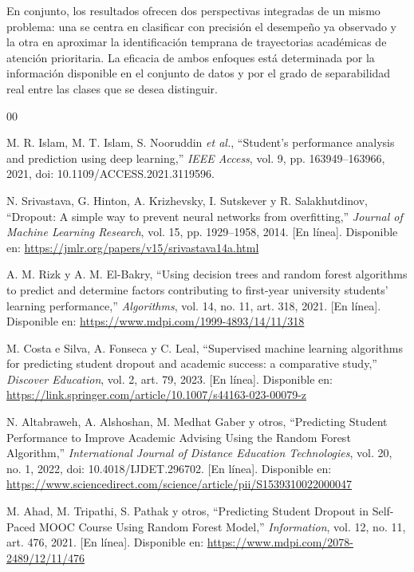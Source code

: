\documentclass[conference]{IEEEtran}
\begin{document}
En conjunto, los resultados ofrecen dos perspectivas integradas de un mismo problema: una se centra en clasificar con precisión el desempeño ya observado y la otra en aproximar la identificación temprana de trayectorias académicas de atención prioritaria. La eficacia de ambos enfoques está determinada por la información disponible en el conjunto de datos y por el grado de separabilidad real entre las clases que se desea distinguir.

\label{sec:referencias}
\begin{thebibliography}{00}

M. R. Islam, M. T. Islam, S. Nooruddin \textit{et al.},
``Student's performance analysis and prediction using deep learning,''
\textit{IEEE Access}, vol. 9, pp. 163949--163966, 2021,
doi: 10.1109/ACCESS.2021.3119596.

N. Srivastava, G. Hinton, A. Krizhevsky, I. Sutskever y
R. Salakhutdinov, ``Dropout: A simple way to prevent neural networks
from overfitting,'' \textit{Journal of Machine Learning Research},
vol. 15, pp. 1929--1958, 2014. [En línea]. Disponible en:
\url{https://jmlr.org/papers/v15/srivastava14a.html}

A. M. Rizk y A. M. El-Bakry, ``Using decision trees and random forest
algorithms to predict and determine factors contributing to first-year
university students' learning performance,'' \textit{Algorithms},
vol. 14, no. 11, art. 318, 2021. [En línea]. Disponible en:
\url{https://www.mdpi.com/1999-4893/14/11/318}

M. Costa e Silva, A. Fonseca y C. Leal, ``Supervised machine learning
algorithms for predicting student dropout and academic success: a
comparative study,'' \textit{Discover Education}, vol. 2, art. 79,
2023. [En línea]. Disponible en:
\url{https://link.springer.com/article/10.1007/s44163-023-00079-z}

N. Altabraweh, A. Alshoshan, M. Medhat Gaber y otros, ``Predicting
Student Performance to Improve Academic Advising Using the Random
Forest Algorithm,'' \textit{International Journal of Distance
Education Technologies}, vol. 20, no. 1, 2022,
doi: 10.4018/IJDET.296702. [En línea]. Disponible en:
\url{https://www.sciencedirect.com/science/article/pii/S1539310022000047}

M. Ahad, M. Tripathi, S. Pathak y otros, ``Predicting Student Dropout
in Self-Paced MOOC Course Using Random Forest Model,''
\textit{Information}, vol. 12, no. 11, art. 476, 2021. [En línea].
Disponible en: \url{https://www.mdpi.com/2078-2489/12/11/476}


\end{thebibliography}
\end{document}
